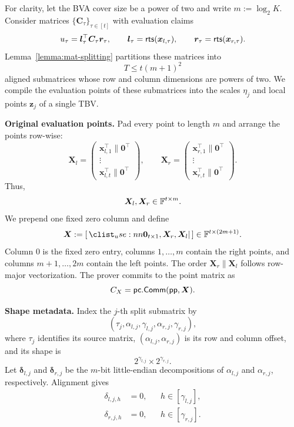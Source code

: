 For clarity, let the BVA cover size be a power of two and write
$m:=\log_2K$.  Consider matrices
$\{\bm C_\tau\}_{\tau\in[t]}$ with evaluation claims
\[
    u_\tau
    =
    \bm l_\tau^{\top}\bm C_\tau\bm r_\tau,
    \qquad
    \bm l_\tau={\sf rts}(\bm x_{l,\tau}),
    \qquad
    \bm r_\tau={\sf rts}(\bm x_{r,\tau}).
\]
Lemma~\ref{lemma:mat-splitting} partitions these matrices into
\[
    T\le t(m+1)^2
\]
aligned submatrices whose row and column dimensions are powers of two.
We compile the evaluation points of these submatrices into the scales
$\eta_j$ and local points $\bm z_j$ of a single TBV.

\mysmallskip\noindent
\textbf{Original evaluation points.}
Pad every point to length $m$ and arrange the points row-wise:
\begin{equation}
\label{eq:point-matrix}
\bm X_l=
\begin{pmatrix}
\bm x_{l,1}^{\top}\|\bm0^{\top}\\[-1mm]
\vdots\\[-1mm]
\bm x_{l,t}^{\top}\|\bm0^{\top}
\end{pmatrix},
\qquad
\bm X_r=
\begin{pmatrix}
\bm x_{r,1}^{\top}\|\bm0^{\top}\\[-1mm]
\vdots\\[-1mm]
\bm x_{r,t}^{\top}\|\bm0^{\top}
\end{pmatrix}.
\end{equation}
Thus,
\[
    \bm X_l,\bm X_r\in{\mathbb{F}}^{t\times m}.
\]
We prepend one fixed zero column and define
\begin{equation}
\label{eq:combined-point-matrix}
    \bm X
    :=
    \concat{\bm0_{t\times1},\bm X_r,\bm X_l}
    \in\Field^{t\times(2m+1)}.
\end{equation}
Column $0$ is the fixed zero entry, columns $1,\ldots,m$ contain the
right points, and columns $m+1,\ldots,2m$ contain the left points.  The order
$\bm X_r\|\bm X_l$ follows row-major vectorization.  The prover commits to
the point matrix as
\[
    C_X={\sf pc}.{\sf Comm}({\sf pp},\bm X).
\]

\mysmallskip\noindent
\textbf{Shape metadata.}
Index the $j$-th split submatrix by
\[
    (\tau_j,\alpha_{l,j},\gamma_{l,j},
             \alpha_{r,j},\gamma_{r,j}),
\]
where $\tau_j$ identifies its source matrix,
$(\alpha_{l,j},\alpha_{r,j})$ is its row and column offset, and its shape is
\[
    2^{\gamma_{l,j}}\times2^{\gamma_{r,j}}.
\]
Let $\bm\delta_{l,j}$ and $\bm\delta_{r,j}$ be the $m$-bit little-endian
decompositions of $\alpha_{l,j}$ and $\alpha_{r,j}$, respectively.
Alignment gives
\begin{equation}
\label{eq:split-alignment}
\begin{aligned}
    \delta_{l,j,h}&=0,
        &&h\in[\gamma_{l,j}],\\
    \delta_{r,j,h}&=0,
        &&h\in[\gamma_{r,j}].
\end{aligned}
\end{equation}

